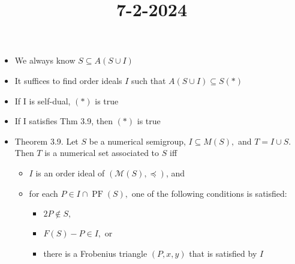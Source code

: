 \documentclass[11pt]{article}
\title{7-2-2024}
\date{}
\DeclareMathOperator{\PF}{PF}
\begin{document}
\maketitle
\begin{itemize}
    \item We always know $S\subseteq A(S\cup I)$
    \item It suffices to find order ideals $I$ such that $A(S\cup I)\subseteq S (*)$
    \item If I is self-dual, $(*)$ is true
    \item If I satisfies Thm 3.9, then $(*)$ is true
    \item Theorem 3.9. Let $S$ be a numerical semigroup, $I\subseteq M(S),$ and $ T=I\cup S$. Then $T$ is a numerical set associated to $S$ iff
    \begin{itemize}
        \item $I$ is an order ideal of $(\mathcal{M}(S),\preceq)$, and 
        \item for each $P\in I\cap \PF(S),$ one of the following conditions is satisfied:
        \begin{itemize}
            \item $2P\notin S,$
            \item $F(S)-P\in I,$ or
            \item there is a Frobenius triangle $(P,x,y)$ that is satisfied by $I$
        \end{itemize}
    \end{itemize}
    \end{itemize}
\end{document}
